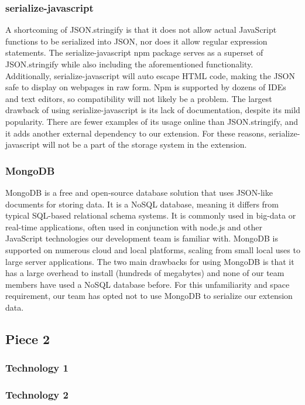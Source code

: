 \documentclass[letterpaper,10pt,titlepage,draftclsnofoot,onecolumn,onesided] {IEEEtran}
\begin{document}
\subsubsection{serialize-javascript}
A shortcoming of JSON.stringify is that it does not allow actual JavaScript functions to be serialized into JSON, nor does it allow regular expression statements. 
The serialize-javascript npm package serves as a superset of JSON.stringify while also including the aforementioned functionality. 
Additionally, serialize-javascript will auto escape HTML code, making the JSON  safe to display on webpages in raw form. 
Npm is supported by dozens of IDEs and text editors, so compatibility will not likely be a problem. 
The largest drawback of using serialize-javascript is its lack of documentation, despite its mild popularity. 
There are fewer examples of its usage online than JSON.stringify, and it adds another external dependency to our extension. 
For these reasons, serialize-javascript will not be a part of the storage system in the extension. \cite{serialize}

\subsubsection{MongoDB}
MongoDB is a free and open-source database solution that uses JSON-like documents for storing data. 
It is a NoSQL database, meaning it differs from typical SQL-based relational schema systems. 
It is commonly used in big-data or real-time applications, often used in conjunction with node.js and other JavaScript technologies our development team is familiar with. 
MongoDB is supported on numerous cloud and local platforms, scaling from small local uses to large server applications. 
The two main drawbacks for using MongoDB is that it has a large overhead to install (hundreds of megabytes) and none of our team members have used a NoSQL database before. 
For this unfamiliarity and space requirement, our team has opted not to use MongoDB to serialize our extension data. \cite{mongo}

\subsection{Piece 2}
\subsubsection{Technology 1}
\subsubsection{Technology 2}
\end{document}
